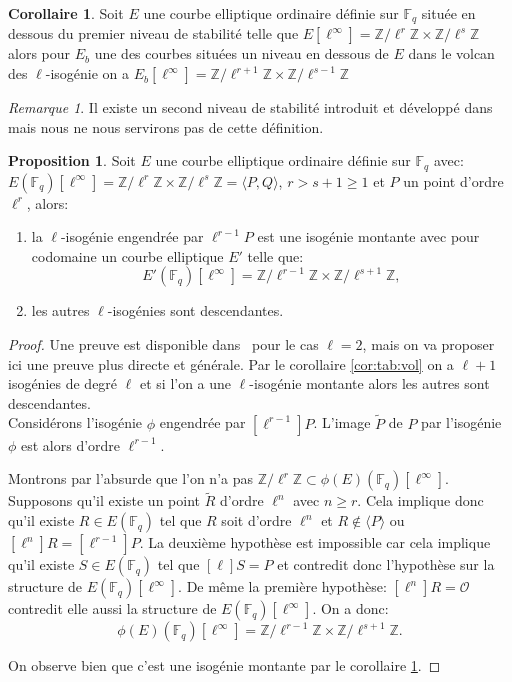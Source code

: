 \documentclass[10pt,a4paper]{book}
\theoremstyle{plain}
\theoremstyle{definition}
\theoremstyle{definition}
\theoremstyle{definition}
\newtheorem{cor}[thm]{Corollaire}
\theoremstyle{definition}
\newtheorem{prop}[thm]{Proposition}
\theoremstyle{definition}
\theoremstyle{remark}
\newtheorem{rem}[thm]{Remarque}
\theoremstyle{remark}
\theoremstyle{definition}
\begin{document}
\begin{cor}
\label{cor:des:str}
Soit $E$ une courbe elliptique ordinaire définie sur $\mathbb{F}_q$ située en 
dessous du premier niveau de stabilité telle que $E[\ell^{\infty}]=\mathbb{Z}/
\ell^r\mathbb{Z} \times \mathbb{Z}/\ell^s\mathbb{Z}$ alors pour $E_b$ une des 
courbes situées un niveau en dessous de $E$ dans le volcan des $\ell$-isogénie 
on a $E_b[\ell^{\infty}]=\mathbb{Z}/\ell^{r+1}\mathbb{Z} \times \mathbb{Z}/
\ell^{s-1}\mathbb{Z}$
\end{cor}

\begin{rem}
Il existe un second niveau de stabilité introduit et développé dans 
\cite{Ionica-Joux10} mais nous ne nous servirons pas de cette définition.
\end{rem}

\begin{prop} 
\label{pro:iso:mon}
Soit $E$ une courbe elliptique ordinaire définie sur $\mathbb{F}_q$ avec: $E(\mathbb{F}_q)[\ell^{\infty}]=\mathbb{Z}/\ell^{r}\mathbb{Z} \times \mathbb{Z}/\ell^{s}\mathbb{Z}= \langle P,Q \rangle $, $r>s +1 \geqslant  1$ et $P$ un point d'ordre $\ell^r$, alors:
\begin{enumerate}
\item la $\ell$-isogénie engendrée par $\ell^{r-1}P$ est une isogénie montante avec pour codomaine un courbe elliptique $E'$ telle que: \[E'(\mathbb{F}_q)[\ell^{\infty}]=\mathbb{Z}/\ell^{r-1}\mathbb{Z} \times \mathbb{Z}/\ell^{s+1}\mathbb{Z}, \]
\item les autres $\ell$-isogénies sont descendantes.
\end{enumerate}
\end{prop}

\begin{proof}
Une preuve est disponible dans~\cite[Proposition 4]{MiretMSTV08} pour le cas $\ell=2$, mais on va proposer ici une preuve plus directe et générale.
Par le corollaire \ref{cor:tab:vol} on a $\ell+1$ isogénies de degré $\ell$ et si l'on a une $\ell$-isogénie montante alors les autres sont descendantes.
\\
Considérons l'isogénie $\phi$ engendrée par $[\ell^{r-1}]P$. L'image $\widetilde{P}$ de $P$ par l'isogénie $\phi$ est alors d'ordre $\ell^{r-1}$. 

Montrons par l'absurde que l'on n'a pas $\mathbb{Z}/\ell^{r}\mathbb{Z} \subset \phi(E)(\mathbb{F}_q)[\ell^{\infty}]$. Supposons qu'il existe un point $\widetilde{R}$ d'ordre $\ell^n$ avec $n \geqslant r$. Cela implique donc qu'il existe $R \in E(\mathbb{F}_q)$ tel que $R$ soit d'ordre $\ell^n$ et $R \notin \langle P \rangle$ ou  $[\ell^n]R =[\ell^{r-1}]P$. La deuxième hypothèse est impossible car cela implique qu'il existe $S \in E(\mathbb{F}_q)$ tel que $[\ell] S=P$ et contredit donc l'hypothèse sur la structure de $E(\mathbb{F}_q)[\ell^{\infty}]$. De même la première hypothèse: $[\ell^n]R = \mathcal{O}$ contredit elle aussi la structure de $E(\mathbb{F}_q)[\ell^{\infty}]$. On a donc:
\[\phi(E)(\mathbb{F}_q)[\ell^{\infty}]=\mathbb{Z}/\ell^{r-1}\mathbb{Z} \times \mathbb{Z}/\ell^{s+1}\mathbb{Z}. \]

On observe bien que c'est une isogénie montante par le corollaire \ref{cor:des:str}.
\end{proof}
\end{document}
